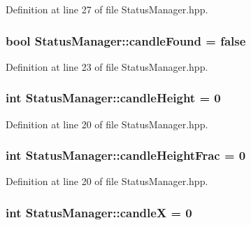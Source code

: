 Definition at line 27 of file Status\-Manager.\-hpp.

\hypertarget{classStatusManager_addac8003cb381bc134170516966135aa}{
\subsubsection[{candle\-Found}]{\setlength{\rightskip}{0pt plus 5cm}bool Status\-Manager\-::candle\-Found = false\hspace{0.3cm}{\ttfamily [static]}}}\label{classStatusManager_addac8003cb381bc134170516966135aa}


Definition at line 23 of file Status\-Manager.\-hpp.

\hypertarget{classStatusManager_a1a9f7a4fdb19e56e3f8352a78ea4648e}{
\subsubsection[{candle\-Height}]{\setlength{\rightskip}{0pt plus 5cm}int Status\-Manager\-::candle\-Height = 0\hspace{0.3cm}{\ttfamily [static]}}}\label{classStatusManager_a1a9f7a4fdb19e56e3f8352a78ea4648e}


Definition at line 20 of file Status\-Manager.\-hpp.

\hypertarget{classStatusManager_ac813f7d48ed51e0246126a53775c5b65}{
\subsubsection[{candle\-Height\-Frac}]{\setlength{\rightskip}{0pt plus 5cm}int Status\-Manager\-::candle\-Height\-Frac = 0\hspace{0.3cm}{\ttfamily [static]}}}\label{classStatusManager_ac813f7d48ed51e0246126a53775c5b65}


Definition at line 20 of file Status\-Manager.\-hpp.

\hypertarget{classStatusManager_a53de0b4eac2d76c8b2d075b8020d1c7f}{
\subsubsection[{candle\-X}]{\setlength{\rightskip}{0pt plus 5cm}int Status\-Manager\-::candle\-X = 0\hspace{0.3cm}{\ttfamily [static]}}}\label{classStatusManager_a53de0b4eac2d76c8b2d075b8020d1c7f}


